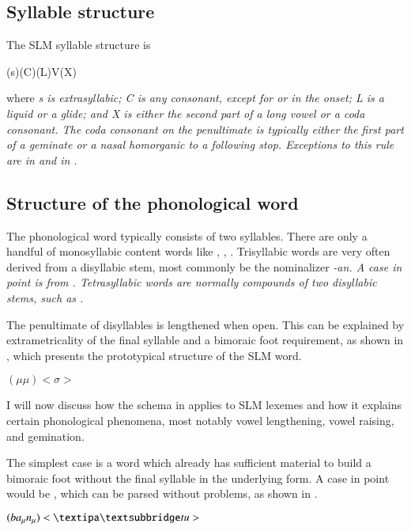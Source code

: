 \subsection{Syllable structure}
The SLM syllable structure is

\ea (s)(C)(L)V(X) \z

where \em s \em is extrasyllabic; 
C is any consonant, except for {\ng} or {\tz} in the onset; 
L is a liquid or a glide;
and X is either the second part of a long vowel or a coda  consonant. 
The coda consonant on the penultimate is typically either the first part of a geminate or a nasal homorganic to a following stop. Exceptions to this rule are  in  and   in  .

\subsection{Structure of the phonological word}

The phonological word typically consists of two syllables. There are only a handful of monosyllabic content words like , , . Trisyllabic words are very often derived from a disyllabic stem, most commonly be the nominalizer \em -an\em. A case in point is  from . Tetrasyllabic words are normally compounds of two disyllabic stems, such as .

The penultimate of disyllables is lengthened when open. This can be explained by extrametricality of the final syllable and a bimoraic foot requirement, as shown in , which presents the prototypical structure of the SLM word.

\ea \label{ex:wordstructure} $(\mu\mu)<\sigma>$ \z

I will now discuss how the schema in  applies to SLM lexemes and how it explains certain phonological phenomena, most notably vowel lengthening, vowel raising, and gemination.

The simplest case is a word which already has sufficient material to build a bimoraic foot without the final syllable in the underlying form. A case in point would be , which can be parsed without problems, as shown in .

\ea \label{ex:phon:wordstructure:banthu} $(ba_{\mu}n_{\mu})<\dentt{}u>$ \z


